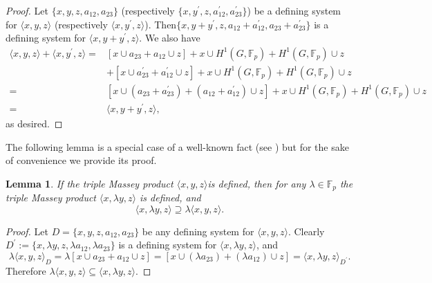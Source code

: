 \documentclass[12pt,leqno]{amsart}
\theoremstyle{plain}
\newtheorem{lem}[thm]{Lemma}
\theoremstyle{definition}
\newcommand{\F}{{\mathbb F}}
\begin{document}
\begin{proof} Let $\{x,y,z, a_{12}, a_{23}\}$ (respectively $\{x,y^\prime,z, a^\prime_{12}, a^\prime_{23}\}$) be a defining system for $\langle x,y,z\rangle$ (respectively $\langle x, y^\prime,z\rangle$). Then$ \{x,y+y^\prime,z, a_{12}+a^\prime_{12}, a_{23}+a^\prime_{23}\}$ is a defining system for $\langle x, y+y^\prime,z\rangle$. We also have
\[
\begin{aligned}
\langle x,y,z\rangle+ \langle x, y^\prime,z\rangle = &[x\cup a_{23}+a_{12}\cup z] +x\cup H^1(G,\F_p)+ H^1(G,\F_p) \cup z \\
&+ [x\cup a^\prime_{23}+a^\prime_{12}\cup z] +x\cup H^1(G,\F_p)+ H^1(G,\F_p) \cup z \\
= & [x\cup (a_{23}+a^\prime_{23})+ (a_{12}+a^\prime_{12})\cup z] + x\cup H^1(G,\F_p)+  H^1(G,\F_p)\cup z\\
=&\langle x,y+y^\prime,z\rangle,
\end{aligned}
\]
as desired.
\end{proof}
 
 The following lemma  is a special case of  a well-known fact (see \cite[Lemma 6.2.4 (ii)]{Fe}) but for the sake of convenience we provide its proof. 
 \begin{lem}
 \label{lem:scalar Massey}
 If the triple Massey product $\langle x,y,z\rangle $is defined, then for any $\lambda\in \F_p$ the triple Massey product $\langle x,\lambda y,z\rangle$ is defined, and
\[
\langle x,\lambda y,z\rangle\supseteq \lambda\langle x,y,z\rangle.
\]
  \end{lem}
  \begin{proof}
  Let $D=\{x,y,z, a_{12}, a_{23}\}$  be any defining system for $\langle x,y,z\rangle$. Clearly $D^\prime:=\{x,\lambda y,z, \lambda a_{12}, \lambda a_{23}\}$ is a defining system for $\langle x,\lambda y,z\rangle$, and 
  \[\lambda \langle x,y,z\rangle_D=\lambda[x\cup a_{23}+a_{12}\cup z]=[x\cup(\lambda a_{23})+(\lambda a_{12})\cup z]= \langle x,\lambda y,z\rangle_{D^\prime}.
  \]
  Therefore $\lambda\langle x,y,z\rangle\subseteq \langle x,\lambda y,z\rangle.$
  \end{proof}
\end{document}
